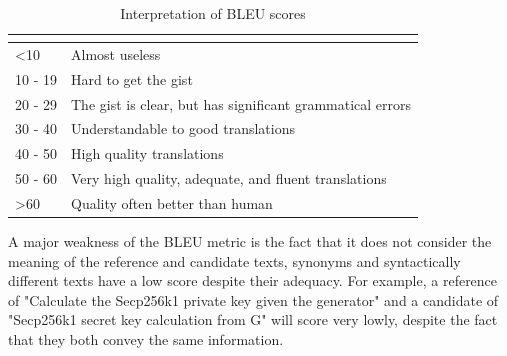 \label{tab:BLEUScale}
\begin{table}[H]
\begin{tabular}{l|l}
\hline
\rowcolor[HTML]{E8EAED} 
\multicolumn{1}{|l|}{\cellcolor[HTML]{E8EAED}{\color[HTML]{202124} \textbf{BLEU Score}}} & \multicolumn{1}{l|}{\cellcolor[HTML]{E8EAED}{\color[HTML]{202124} Interpretation}} \\ \hline
\rowcolor[HTML]{FFFFFF} 
{\color[HTML]{202124} \textless 10}                                                      & {\color[HTML]{202124} Almost useless}                                              \\
\rowcolor[HTML]{FFFFFF} 
{\color[HTML]{202124} 10 - 19}                                                           & {\color[HTML]{202124} Hard to get the gist}                                        \\
\rowcolor[HTML]{FFFFFF} 
{\color[HTML]{202124} 20 - 29}                                                           & {\color[HTML]{202124} The gist is clear, but has significant grammatical errors}   \\
\rowcolor[HTML]{FFFFFF} 
{\color[HTML]{202124} 30 - 40}                                                           & {\color[HTML]{202124} Understandable to good translations}                         \\
\rowcolor[HTML]{FFFFFF} 
{\color[HTML]{202124} 40 - 50}                                                           & {\color[HTML]{202124} High quality translations}                                   \\
\rowcolor[HTML]{FFFFFF} 
{\color[HTML]{202124} 50 - 60}                                                           & {\color[HTML]{202124} Very high quality, adequate, and fluent translations}        \\
\rowcolor[HTML]{FFFFFF} 
{\color[HTML]{202124} \textgreater 60}                                                   & {\color[HTML]{202124} Quality often better than human}
\end{tabular}
\caption{Interpretation of BLEU scores \cite{evaluationSummarization}}
\end{table}

A major weakness of the BLEU metric is the fact that it does not consider the meaning of the reference and candidate texts, synonyms and syntactically different texts have a low score despite their adequacy. For example, a reference of "Calculate the Secp256k1 private key given the generator" and a candidate of "Secp256k1 secret key calculation from G" will score very lowly, despite the fact that they both convey the same information. 

